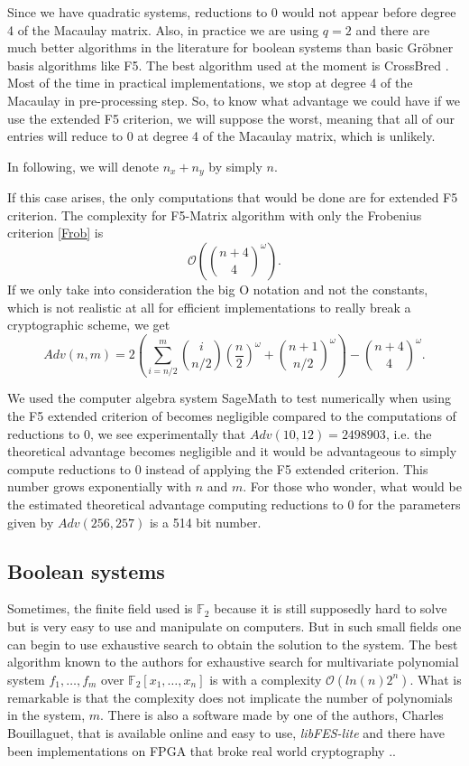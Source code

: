 \documentclass[english]{article}
\begin{document}
		Since we have quadratic systems, reductions to 0 would not appear before degree 4 of the Macaulay matrix. Also, in practice we are using $q=2$ and there are much better algorithms in the literature for boolean systems than basic Gröbner basis algorithms like F5. The best algorithm used at the moment is CrossBred \cite{JV17}. Most of the time in practical implementations, we stop at degree 4 of the Macaulay in pre-processing step. So, to know what advantage we could have if we use the extended F5 criterion, we will suppose the worst, meaning that all of our entries will reduce to 0 at degree 4 of the Macaulay matrix, which is unlikely.
		
		In following, we will denote $n_x + n_y$ by simply $n$.
		
		If this case arises, the only computations that would be done are for extended F5 criterion. The complexity for F5-Matrix algorithm with only the Frobenius criterion \ref{Frob} is 
		$$
		\mathcal{O}\left(\binom{n + 4}{4}^\omega\right).
		$$
		If we only take into consideration the big O notation and not the constants, which is not realistic at all for efficient implementations to really break a cryptographic scheme, we get
		\begin{equation}
			Adv(n, m) = 2\left(\sum_{i = n/2}^{m}\binom{i}{n/2}\left(\frac{n}{2}\right)^\omega + \binom{n + 1}{n/2}^\omega\right) - \binom{n + 4}{4}^\omega.
			\label{equation_complex}
		\end{equation}
		
		We used the computer algebra system SageMath \cite{sagemath} to test numerically when using the F5 extended criterion of \cite{FSS11} becomes negligible compared to the computations of reductions to 0, we see experimentally that $Adv(10, 12) = 2498903$, i.e. the theoretical advantage becomes negligible and it would be advantageous to simply compute reductions to 0 instead of applying the F5 extended criterion. This number grows exponentially with $n$ and $m$. For those who wonder, what would be the estimated theoretical advantage computing reductions to 0 for the parameters given by \cite{HJ23} $Adv(256, 257)$ is a 514 bit number.
		
		\subsection{Boolean systems}
		Sometimes, the finite field used is $\mathbb{F}_2$ because it is still supposedly hard to solve but is very easy to use and manipulate on computers. But in such small fields one can begin to use exhaustive search to obtain the solution to the system. The best algorithm known to the authors for exhaustive search for multivariate polynomial system $f_1,\dots,f_m$ over $\mathbb{F}_2[x_1,\dots,x_n]$ is \cite{BCC+10} with a complexity $\mathcal{O}(ln(n)2^n)$. What is remarkable is that the complexity does not implicate the number of polynomials in the system, $m$. There is also a software made by one of the authors, Charles Bouillaguet, that is available online and easy to use, \textit{libFES-lite} \cite{Bouilla22} and there have been implementations on FPGA that broke real world cryptography \cite{DDVY20}..
		
\end{document}
